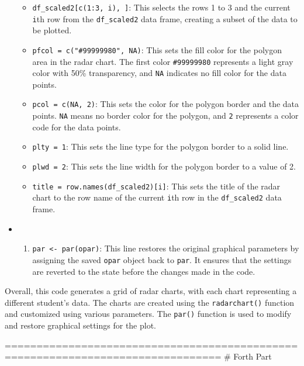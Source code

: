 \documentclass[
]{article}
\providecommand{\tightlist}{%
  \setlength{\itemsep}{0pt}\setlength{\parskip}{0pt}}
\begin{document}
\begin{itemize}
  \begin{itemize}
  \tightlist
  \item
    \texttt{df\_scaled2{[}c(1:3,\ i),\ {]}}: This selects the rows 1 to
    3 and the current \texttt{i}th row from the \texttt{df\_scaled2}
    data frame, creating a subset of the data to be plotted.
  \item
    \texttt{pfcol\ =\ c("\#99999980",\ NA)}: This sets the fill color
    for the polygon area in the radar chart. The first color
    \texttt{\#99999980} represents a light gray color with 50\%
    transparency, and \texttt{NA} indicates no fill color for the data
    points.
  \item
    \texttt{pcol\ =\ c(NA,\ 2)}: This sets the color for the polygon
    border and the data points. \texttt{NA} means no border color for
    the polygon, and \texttt{2} represents a color code for the data
    points.
  \item
    \texttt{plty\ =\ 1}: This sets the line type for the polygon border
    to a solid line.
  \item
    \texttt{plwd\ =\ 2}: This sets the line width for the polygon border
    to a value of 2.
  \item
    \texttt{title\ =\ row.names(df\_scaled2){[}i{]}}: This sets the
    title of the radar chart to the row name of the current \texttt{i}th
    row in the \texttt{df\_scaled2} data frame.
  \end{itemize}
\item
  \begin{enumerate}
  \def\labelenumi{\arabic{enumi}.}
  \setcounter{enumi}{5}
  \tightlist
  \item
    \texttt{par\ \textless{}-\ par(opar)}: This line restores the
    original graphical parameters by assigning the saved \texttt{opar}
    object back to \texttt{par}. It ensures that the settings are
    reverted to the state before the changes made in the code.
  \end{enumerate}
\end{itemize}

Overall, this code generates a grid of radar charts, with each chart
representing a different student's data. The charts are created using
the \texttt{radarchart()} function and customized using various
parameters. The \texttt{par()} function is used to modify and restore
graphical settings for the plot.

================================================================================
\# Forth Part
\end{document}
